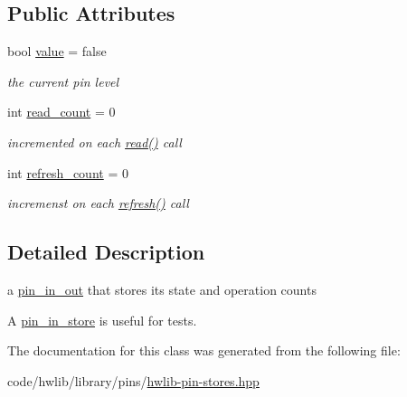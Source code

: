 \subsection*{Public Attributes}
\begin{DoxyCompactItemize}
\item 
\mbox{\label{classhwlib_1_1pin__in__store_ab0652a2e0e5031cd9ee5cf595fb79bd8}} 
bool \hyperlink{classhwlib_1_1pin__in__store_ab0652a2e0e5031cd9ee5cf595fb79bd8}{value} = false
\begin{DoxyCompactList}\small\item\em the current pin level \end{DoxyCompactList}\item 
\mbox{\label{classhwlib_1_1pin__in__store_a92df8af624eafedb4431700f149ef154}} 
int \hyperlink{classhwlib_1_1pin__in__store_a92df8af624eafedb4431700f149ef154}{read\+\_\+count} = 0
\begin{DoxyCompactList}\small\item\em incremented on each \hyperlink{classhwlib_1_1pin__in__store_a561cf1c65fd14dbfba4c352ef4a186fa}{read()} call \end{DoxyCompactList}\item 
\mbox{\label{classhwlib_1_1pin__in__store_a90b7370c441d2c99d0cf7f740717458e}} 
int \hyperlink{classhwlib_1_1pin__in__store_a90b7370c441d2c99d0cf7f740717458e}{refresh\+\_\+count} = 0
\begin{DoxyCompactList}\small\item\em incremenst on each \hyperlink{classhwlib_1_1pin__in__store_a74fdba836b96f7a08327e96b8921e58c}{refresh()} call \end{DoxyCompactList}\end{DoxyCompactItemize}


\subsection{Detailed Description}
a \hyperlink{classhwlib_1_1pin__in__out}{pin\+\_\+in\+\_\+out} that stores its state and operation counts

A \hyperlink{classhwlib_1_1pin__in__store}{pin\+\_\+in\+\_\+store} is useful for tests. 

The documentation for this class was generated from the following file\+:\begin{DoxyCompactItemize}
\item 
code/hwlib/library/pins/\hyperlink{hwlib-pin-stores_8hpp}{hwlib-\/pin-\/stores.\+hpp}\end{DoxyCompactItemize}
